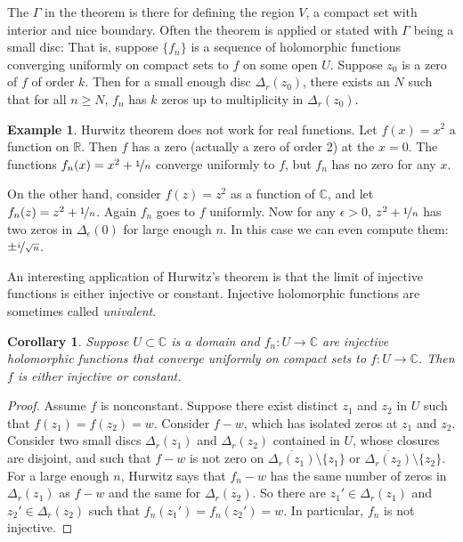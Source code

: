 \documentclass[12pt,openany]{book}
\newcommand{\C}{{\mathbb{C}}}
\newcommand{\R}{{\mathbb{R}}}
\newcommand{\myindex}[1]{#1\index{#1}}
\theoremstyle{plain}
\newtheorem{cor}[thm]{Corollary}
\theoremstyle{remark}
\theoremstyle{definition}
\theoremstyle{exercise}
\theoremstyle{example}
\newtheorem{example}[thm]{Example}
\begin{document}
The $\Gamma$ in the theorem is there for defining the region
$V$, a compact set with interior and nice boundary.
Often the theorem is applied or stated with $\Gamma$ being a small disc:
That is, suppose $\{ f_n \}$ is a sequence of holomorphic
functions converging uniformly
on compact sets to $f$ on some open $U$.  Suppose $z_0$ is a zero of
$f$ of order $k$.  Then for a small enough disc $\Delta_r(z_0)$,
there exists an $N$ such that
for all $n \geq N$, $f_n$ has $k$ zeros up to multiplicity in
$\Delta_r(z_0)$.

\begin{example}
Hurwitz theorem does not work for real functions.  Let $f(x) =
x^2$ a function on $\R$.  Then $f$ has a zero (actually a zero of order 2)
at the $x=0$.  The functions $f_n(x) = x^2+\nicefrac{1}{n}$ converge uniformly
to $f$, but $f_n$ has no zero for any $x$.

On the other hand, consider $f(z) = z^2$ as a function of $\C$, and let
$f_n(z) = z^2+\nicefrac{1}{n}$.  Again $f_n$ goes to $f$ uniformly.  Now for
any $\epsilon > 0$, $z^2+\nicefrac{1}{n}$ has
two zeros in $\Delta_\epsilon(0)$ for large enough $n$.  In this case we can even compute
them: $\pm \nicefrac{i}{\sqrt{n}}$.
\end{example}

An interesting application of Hurwitz's theorem is that the limit of
injective functions is either injective or constant.
Injective holomorphic
functions are sometimes called \emph{\myindex{univalent}}.

\begin{cor} \label{cor:univalentlimit}
Suppose $U \subset \C$ is a domain and $f_n \colon U \to \C$ are
injective holomorphic functions that converge uniformly on compact sets
to $f \colon U \to \C$.  Then $f$ is either injective or constant.
\end{cor}

\begin{proof}
Assume $f$ is nonconstant.
Suppose there exist distinct $z_1$ and $z_2$ in $U$ such that $f(z_1) =
f(z_2) = w$.  Consider $f-w$, which has isolated zeros at $z_1$ and $z_2$.
Consider two small discs $\Delta_r(z_1)$ and $\Delta_r(z_2)$ contained in
$U$, whose closures are disjoint,
and such that $f-w$ is not zero on
$\overline{\Delta_r(z_1)} \setminus \{ z_1 \}$ or
$\overline{\Delta_r(z_2)} \setminus \{ z_2 \}$.
For a large enough $n$, Hurwitz says that $f_n-w$ has the same number of
zeros in $\Delta_r(z_1)$ as $f-w$ and the same for $\Delta_r(z_2)$.
So there are $z_1' \in \Delta_r(z_1)$ and
$z_2' \in \Delta_r(z_2)$ such that $f_n(z_1')=f_n(z_2')=w$.
In particular, $f_n$ is not injective.
\end{proof}
\end{document}
